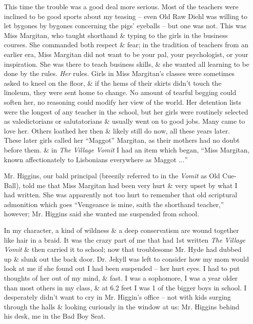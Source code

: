 \documentclass{article}
\numberwithin{equation}{section}
\begin{document}
This time the trouble was a good deal more serious. Most of the teachers were inclined to be good sports about my teasing -- even Old Raw Diehl was willing to let bygones by bygones concerning the pigs' eyeballs -- but one was not. This was Miss Margitan, who taught shorthand \& typing to the girls in the business courses. She commanded both respect \& fear; in the tradition of teachers from an earlier era, Miss Margitan did not want to be your pal, your psychologist, or your inspiration. She was there to teach business skills, \& she wanted all learning to be done by the rules. \textit{Her} rules. Girls in Miss Margitan's classes were sometimes asked to kneel on the floor, \& if the hems of their skirts didn't touch the linoleum, they were sent home to change. No amount of tearful begging could soften her, no reasoning could modify her view of the world. Her detention lists were the longest of any teacher in the school, but her girls were routinely selected as valedictorians or salutatorians \& usually went on to good jobs. Many came to love her. Others loathed her then \& likely still do now, all these years later. These later girls called her ``Maggot'' Margitan, as their mothers had no doubt before them. \& in \textit{The Village Vomit} I had an item which began, ``Miss Margitan, known affectionately to Lisbonians everywhere as Maggot $\ldots$''

Mr. Higgins, our bald principal (breezily referred to in the \textit{Vomit} as Old Cue-Ball), told me that Miss Margitan had been very hurt \& very upset by what I had written. She was apparently not too hurt to remember that old scriptural admonition which goes ``Vengeance is mine, saith the shorthand teacher,'' however; Mr. Higgins said she wanted me suspended from school.

In my character, a kind of wildness \& a deep conservatism are wound together like hair in a braid. It was the crazy part of me that had 1st written \textit{The Village Vomit} \& then carried it to school; now that troublesome Mr. Hyde had dubbed up \& slunk out the back door. Dr. Jekyll was left to consider how my mom would look at me if she found out I had been suspended -- her hurt eyes. I had to put thoughts of her out of my mind, \& fast. I was a sophomore, I was a year older than most others in my class, \& at 6.2 feet I was 1 of the bigger boys in school. I desperately didn't want to cry in Mr. Higgin's office -- not with kids surging through the halls \& looking curiously in the window at us: Mr. Higgins behind his desk, me in the Bad Boy Seat.
\end{document}
